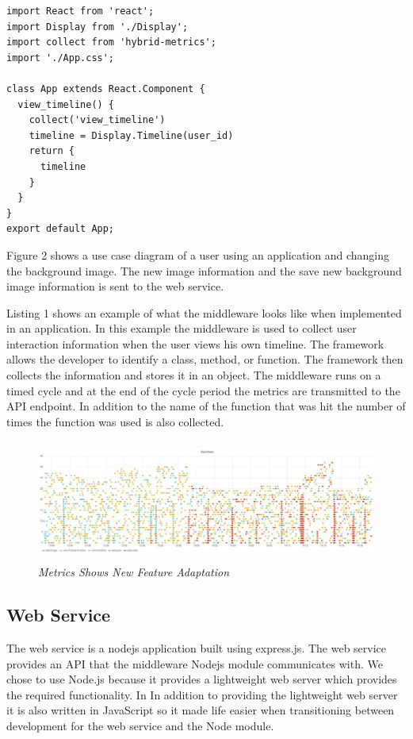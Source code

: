 \begin{lstlisting}[caption=Hybrid-Metrics.js Example]
import React from 'react';
import Display from './Display';
import collect from 'hybrid-metrics';
import './App.css';

class App extends React.Component {
  view_timeline() {
    collect('view_timeline')
    timeline = Display.Timeline(user_id) 
    return { 
      timeline
    }
  } 
}
export default App;
\end{lstlisting}

Figure 2 shows a use case diagram of a user using an application and changing the background image. The new image information and the save new background image information is sent to the web service.

Listing 1 shows an example of what the middleware looks like when implemented in an application. In this example the middleware is used to collect user interaction information when the user views his own timeline. The framework allows the developer to identify a class, method, or function. The framework then collects the information and stores it in an object. The middleware runs on a timed cycle and at the end of the cycle period the metrics are transmitted to the API endpoint. In addition to the name of the function that was hit the number of times the function was used is also collected. 

\begin{figure}
  \includegraphics[width=\textwidth,height=4cm]{images/nf1_smaller.jpg}
  \caption{\small \sl Metrics Shows New Feature Adaptation\label{fig:new_feature_example}}  
\end{figure}
\subsection{Web Service}
The web service is a nodejs application built using express.js. The web service provides an API that the middleware Nodejs module communicates with. We chose to use Node.js because it provides a lightweight web server which provides the required functionality. In In addition to providing the lightweight web server it is also written in JavaScript so it made life easier when transitioning between development for the web service and the Node module. 

